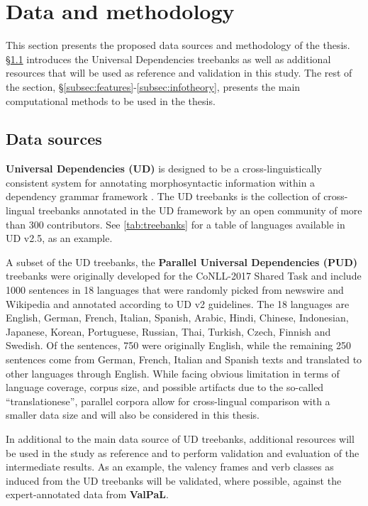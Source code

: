 \section{Data and methodology}\label{sec:methodology}

This section presents the proposed data sources and methodology of the thesis. \S\ref{subsec:data-sources} introduces the Universal Dependencies treebanks as well as additional resources that will be used as reference and validation in this study. The rest of the section, \S\ref{subsec:features}-\ref{subsec:infotheory}, presents the main computational methods to be used in the thesis.

\subsection{Data sources}\label{subsec:data-sources}

\textbf{Universal Dependencies (UD)} is designed to be a cross-linguistically consistent system for annotating morphosyntactic information within a dependency grammar framework \citep{demarneffe2021}. The UD treebanks \citep{universaldep} is the collection of cross-lingual treebanks annotated in the UD framework by an open community of more than 300 contributors. See \ref{tab:treebanks} for a table of languages available in UD v2.5, as an example. 



A subset of the UD treebanks, the \textbf{Parallel Universal Dependencies (PUD)} treebanks were originally developed for the CoNLL-2017 Shared Task \citep{zeman2017} and include 1000 sentences in 18 languages that were randomly picked from newswire and Wikipedia and annotated according to UD v2 guidelines. The 18 languages are English, German, French, Italian, Spanish, Arabic, Hindi, Chinese, Indonesian, Japanese, Korean, Portuguese, Russian, Thai, Turkish, Czech, Finnish and Swedish. Of the sentences, 750 were originally English, while the remaining 250 sentences come from German, French, Italian and Spanish texts and translated to other languages through English. While facing obvious limitation in terms of language coverage, corpus size, and possible artifacts due to the so-called ``translationese'', parallel corpora allow for cross-lingual comparison with a smaller data size and will also be considered in this thesis.

In additional to the main data source of UD treebanks, additional resources will be used in the study as reference and to perform validation and evaluation of the intermediate results. As an example, the valency frames and verb classes as induced from the UD treebanks will be validated, where possible, against the expert-annotated data from \textbf{ValPaL}\citep{valpal}. 

